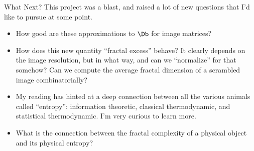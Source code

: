 \documentclass{beamer}
\begin{document}
\begin{frame}{What Next?}
	This project was a blast, and raised a lot of new questions that I'd like to pursue at some point.

  \begin{itemize}
  \item
    How good are these approximations to $\Db$ for image matrices?
  \item
	How does this new quantity ``fractal excess'' behave? It clearly depends on the image resolution, but in what way, and can we ``normalize'' for that somehow? Can we compute the average fractal dimension of a scrambled image combinatorially?
  \item
	My reading has hinted at a deep connection between all the various animals called ``entropy'': information theoretic, classical thermodynamic, and statistical thermodynamic. I'm very curious to learn more.
  \item What is the connection between the fractal complexity of a physical object and its physical entropy?
  \end{itemize}
  
\end{frame}





\end{document}
